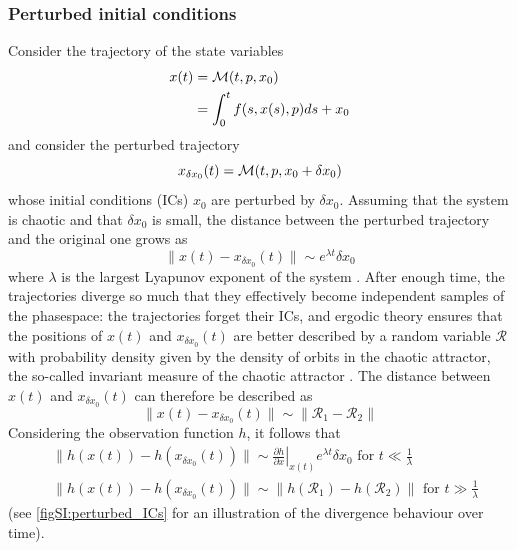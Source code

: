 \subsubsection{Perturbed initial conditions}
Consider the trajectory of the state variables
\begin{equation}
\begin{split}\label{eqSI:prob_statement}
        x(t) &= \mathcal{M}(t,p,x_0)\\
            &=\int_0^t f(s, x(s), p) ds + x_0
\end{split}
\end{equation}
and consider the perturbed trajectory 
\begin{equation}\label{eqSI:prob_statement2}
    x_{\delta x_0}(t) = \mathcal{M}(t, p, x_0 + \delta x_0)
\end{equation}
whose initial conditions (ICs) $x_0$ are perturbed by $\delta x_0$. Assuming that the system is chaotic and that $\delta x_0$ is small, the distance between the perturbed trajectory and the original one grows as
\begin{equation}
	\|x(t) - x_{\delta x_0}(t)\| \sim e^{\lambda t}\delta x_0
\end{equation}
where $\lambda$ is the largest Lyapunov exponent of the system \cite{strogatz2018nonlinear}.
% 
After enough time, the trajectories diverge so much that they effectively become independent samples of the phasespace: the trajectories forget their ICs, and ergodic theory ensures that the positions of $x(t)$ and $x_{\delta x_0}(t)$ are better described by a random variable $\mathcal R$ with probability density given by the density of orbits in the chaotic attractor, the so-called invariant measure of the chaotic attractor \cite{jost2005dynamical}.
% 
The distance between $x(t)$ and $x_{\delta {x_0}}(t)$ can therefore be described as 
\begin{equation}
	\|x(t) - x_{\delta x_0}(t)\| \sim \|\mathcal{R}_1 - \mathcal{R}_2 \|
\end{equation}
%
Considering the observation function $h$, it follows that
\begin{equation}\label{eqSI:divergenceTrajectoriesICs}
\begin{aligned}
	&\|h(x(t)) - h(x_{\delta x_0}(t))\| \sim \left.\frac{\partial h}{\partial x}\right|_{x(t)} e^{\lambda t}\delta x_0 \text{    for }t\ll \frac{1}{\lambda}\\
	&\|h(x(t)) - h(x_{\delta x_0}(t))\| \sim \|h\left(\mathcal{R}_1\right) - h\left(\mathcal{R}_2\right) \| \text{    for }t\gg \frac{1}{\lambda}
\end{aligned}
\end{equation}
(see \cref{figSI:perturbed_ICs} for an illustration of the divergence behaviour over time).


